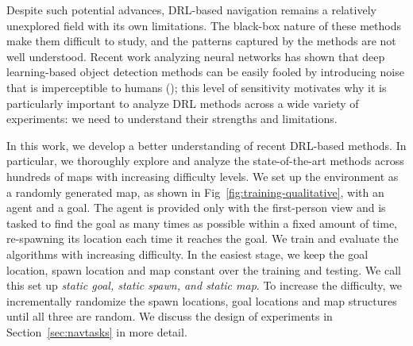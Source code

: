 Despite such potential advances, DRL-based navigation remains a relatively unexplored field with its own limitations. 
The black-box nature of these methods make them difficult to study, and the patterns captured by the methods are not well understood. 
Recent work analyzing neural networks has shown that deep learning-based object detection methods can be easily fooled by introducing noise that is imperceptible to humans (\cite{NgYoClCVPR2015}); this level of sensitivity motivates why it is particularly important to analyze DRL methods across a wide variety of experiments: we need to understand their strengths and limitations.


In this work, we develop a better understanding of recent DRL-based methods. In particular, we thoroughly explore and analyze the state-of-the-art \cite{MiPaViICLR2017} methods across hundreds of maps with increasing difficulty levels. 
We set up the environment as a randomly generated map, as shown in Fig~\ref{fig:training-qualitative}, with an agent and a goal.
The agent is provided only with the first-person view and is tasked to find the goal as many times as possible within a fixed amount of time, re-spawning its location each time it reaches the goal. 
We train and evaluate the algorithms with increasing difficulty.
In the easiest stage, we keep the goal location, spawn location and map constant over the training and testing.
We call this set up \emph{static goal, static spawn, and static map}.
To increase the difficulty, we incrementally randomize the spawn locations, goal locations and map structures until all three are random.
We discuss the design of experiments in Section~\ref{sec:navtasks} in more detail.

